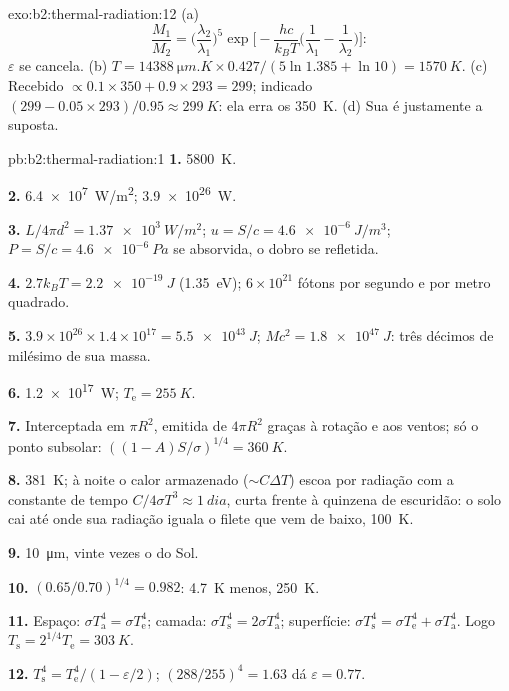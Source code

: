 \begin{solution}{exo:b2:thermal-radiation:12}
(a)
\[
\frac{M_1}{M_2} = \Big(\frac{\lambda_2}{\lambda_1}\Big)^5\exp\Big[-\frac{hc}{k_BT}\Big(\frac{1}{\lambda_1} - \frac{1}{\lambda_2}\Big)\Big] :
\]
$\varepsilon$ se cancela. (b) $T = \qty{14388}{\micro m.K} \times 0.427/(5\ln 1.385 +
\ln 10) = \qty{1570}{K}$. (c) Recebido $\propto 0.1 \times 350 + 0.9 \times 293 =
299$; indicado $(299 - 0.05 \times 293)/0.95 \approx \qty{299}{K}$: ela erra os
\qty{350}{K}. (d) Sua  é justamente a suposta.
\end{solution}

\begin{solution}{pb:b2:thermal-radiation:1}
\textbf{1.} \qty{5800}{K}.

\textbf{2.} \qty{6.4e7}{W/m^2}; \qty{3.9e26}{W}.

\textbf{3.} $L/4\pi d^2 = \qty{1.37e3}{W/m^2}$; $u = S/c = \qty{4.6e-6}{J/m^3}$;
$P = S/c = \qty{4.6e-6}{Pa}$ se absorvida, o dobro se refletida.

\textbf{4.} $2.7k_BT = \qty{2.2e-19}{J}$ (\qty{1.35}{eV}); $6 \times 10^{21}$
fótons por segundo e por metro quadrado.

\textbf{5.} $3.9 \times 10^{26} \times 1.4 \times 10^{17} = \qty{5.5e43}{J}$; $Mc^2 =
\qty{1.8e47}{J}$: três décimos de milésimo de sua massa.

\textbf{6.} \qty{1.2e17}{W}; $T_{\text{e}} = \qty{255}{K}$.

\textbf{7.} Interceptada em $\pi R^2$, emitida de $4\pi R^2$ graças à
rotação e aos ventos; só o ponto subsolar: $((1 - A)S/\sigma)^{1/4} =
\qty{360}{K}$.

\textbf{8.} \qty{381}{K}; à noite o calor armazenado ($\sim C\Delta T$) escoa por
radiação com a constante de tempo $C/4\sigma T^3 \approx \qty{1}{dia}$, curta
frente à quinzena de escuridão: o solo cai até onde sua
radiação iguala o filete que vem de baixo, \qty{100}{K}.

\textbf{9.} \qty{10}{\micro m}, vinte vezes o do Sol.

\textbf{10.} $(0.65/0.70)^{1/4} = 0.982$: \qty{4.7}{K} menos, \qty{250}{K}.

\textbf{11.} Espaço: $\sigma T_{\text{a}}^4 = \sigma T_{\text{e}}^4$; camada: $\sigma
T_{\text{s}}^4 = 2\sigma T_{\text{a}}^4$; superfície: $\sigma T_{\text{s}}^4 = \sigma
T_{\text{e}}^4 + \sigma T_{\text{a}}^4$. Logo $T_{\text{s}} = 2^{1/4}T_{\text{e}} = \qty{303}{K}$.

\textbf{12.} $T_{\text{s}}^4 = T_{\text{e}}^4/(1 - \varepsilon/2)$; $(288/255)^4 = 1.63$
dá $\varepsilon = 0.77$.


\end{solution}
